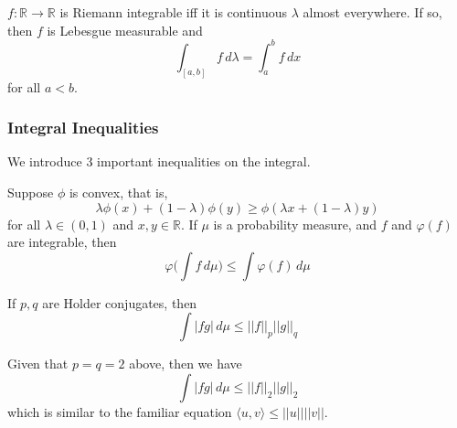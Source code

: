 \documentclass{article}
\begin{document}
      \begin{theorem}
        $f: \mathbb{R} \longrightarrow \mathbb{R}$ is Riemann integrable iff it is continuous $\lambda$ almost everywhere. If so, then $f$ is Lebesgue measurable and 
        \begin{equation}
          \int_{[a, b]} f \,d\lambda = \int_a^b f \, dx
        \end{equation}
        for all $a < b$. 
      \end{theorem}

    \subsubsection{Integral Inequalities}

      We introduce 3 important inequalities on the integral. 

      \begin{theorem}
        Suppose $\phi$ is convex, that is, 
        \begin{equation}
          \lambda \phi(x) + (1 - \lambda) \phi(y) \geq \phi (\lambda x + (1 - \lambda) y)
        \end{equation}
        for all $\lambda \in (0, 1)$ and $x, y \in \mathbb{R}$. If $\mu$ is a probability measure, and $f$ and $\varphi(f)$ are integrable, then 
        \begin{equation}
          \varphi\bigg( \int f \,d\mu \bigg) \leq \int \varphi(f) \,d\mu
        \end{equation}
      \end{theorem}

      \begin{theorem}
        If $p, q$ are Holder conjugates, then 
        \begin{equation}
          \int |f g|\, d\mu \leq ||f||_p ||g||_q
        \end{equation}
      \end{theorem}

      \begin{corollary}
        Given that $p = q = 2$ above, then we have 
        \begin{equation}
          \int |f g|\, d\mu \leq ||f||_2 ||g||_2
        \end{equation}
        which is similar to the familiar equation $\langle u, v \rangle \leq ||u|| ||v||$. 
      \end{corollary}
\end{document}
